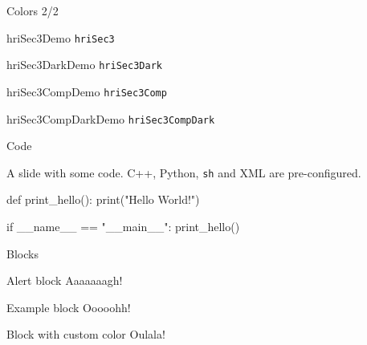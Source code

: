 \documentclass[compress]{beamer}
\begin{document}
\begin{frame}{Colors 2/2}
\begin{multicols}{2}
\begin{beamercolorbox}[wd=\linewidth,ht=2ex,leftskip=.5ex,dp=0.7ex]{hriSec3Demo}
	\texttt{hriSec3}
\end{beamercolorbox}
\begin{beamercolorbox}[wd=\linewidth,ht=2ex,leftskip=.5ex,dp=0.7ex]{hriSec3DarkDemo}
	\texttt{hriSec3Dark}
\end{beamercolorbox}
\begin{beamercolorbox}[wd=\linewidth,ht=2ex,leftskip=.5ex,dp=0.7ex]{hriSec3CompDemo}
	\texttt{hriSec3Comp}
\end{beamercolorbox}
\begin{beamercolorbox}[wd=\linewidth,ht=2ex,leftskip=.5ex,dp=0.7ex]{hriSec3CompDarkDemo}
	\texttt{hriSec3CompDark}
\end{beamercolorbox}

\end{multicols}
\end{frame}

\begin{frame}[fragile]{Code}

    A slide with some code. C++, Python, \texttt{sh} and XML are pre-configured.

\begin{pythoncode}

def print_hello():
    print("Hello World!")


if __name__ == "__main__":
    print_hello()
\end{pythoncode}

\end{frame}


\begin{frame}[containsverbatim]{Blocks}
\begin{alertblock}{Alert block}
	Aaaaaaagh!
\end{alertblock}

\begin{exampleblock}{Example block}
    Ooooohh!
\end{exampleblock}

\begingroup
{}
\begin{block}{Block with custom color}
    Oulala!
\end{block}
\endgroup
\end{frame}
\end{document}
